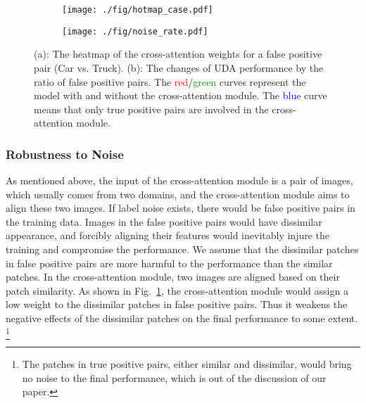 \documentclass[dvipsnames, svgnames, x11names, table]{article} \usepackage{iclr2022_conference,times}
\begin{document}
\begin{spacing}{1.0}
\begin{figure}[!t]
\centering
\begin{subfigure}[c]{0.54\textwidth}
\centering
\texttt{[image: ./fig/hotmap\_case.pdf]}
\vspace{-5mm}
\caption{}
\vspace{-3mm}
\label{fig:noisecase}
\end{subfigure}
\hfill
\begin{subfigure}[c]{0.44\textwidth}
\centering
\texttt{[image: ./fig/noise\_rate.pdf]}
\vspace{-5mm}
\caption{}
\vspace{-3mm}
\label{fig:noisecurve}
\end{subfigure}
\caption{(a): The heatmap of the cross-attention weights for a false positive pair (Car vs. Truck). (b): The changes of UDA performance by the ratio of false positive pairs. The \textcolor{red}{red}/\textcolor{Green}{green} curves represent the model with and without the cross-attention module. The \textcolor{blue}{blue} curve means that only true positive pairs are involved in the cross-attention module.}
\vspace{-3mm}
\end{figure}

\subsubsection{Robustness to Noise}


As mentioned above, the input of the cross-attention module is a pair of images, which usually comes from two domains, and the cross-attention module aims to align these two images.
If label noise exists, there would be false positive pairs in the training data. Images in the false positive pairs would have dissimilar appearance, and forcibly aligning their features would inevitably injure the training and compromise the performance.
We assume that the dissimilar patches in false positive pairs are more harmful to the performance than the similar patches.
In the cross-attention module, two images are aligned based on their patch similarity. As shown in Fig.~\ref{fig:noisecase}, the cross-attention module would assign a low weight to the dissimilar patches in false positive pairs. Thus it weakens the negative effects of the dissimilar patches on the final performance to some extent.
\footnote{The patches in true positive pairs, either similar and dissimilar, would bring no noise to the final performance, which is out of the discussion of our paper.}


\end{spacing}
\end{document}
